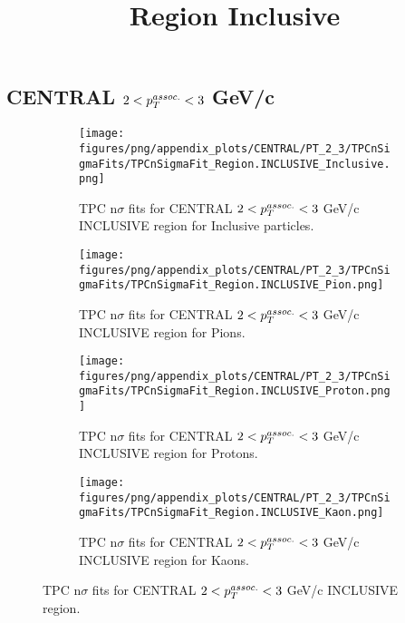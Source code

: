     
            \subsection{CENTRAL $2 < \pTassoc < 3$ GeV/c}
            \begin{figure}[H]
                \title{Region Inclusive}
                \begin{subfigure}[b]{0.5\textwidth}
                    \centering
                    \texttt{[image: figures/png/appendix\_plots/CENTRAL/PT\_2\_3/TPCnSigmaFits/TPCnSigmaFit\_Region.INCLUSIVE\_Inclusive.png]}
                    \caption{TPC n$\sigma$ fits for CENTRAL $2 < \pTassoc < 3$ GeV/c INCLUSIVE region for Inclusive particles.}
                    \label{fig:appendix_CENTRAL_$2 < \pTassoc < 3$ GeV/c_INCLUSIVE_Inclusive}
                \end{subfigure}
                \begin{subfigure}[b]{0.5\textwidth}
                    \centering
                    \texttt{[image: figures/png/appendix\_plots/CENTRAL/PT\_2\_3/TPCnSigmaFits/TPCnSigmaFit\_Region.INCLUSIVE\_Pion.png]}
                    \caption{TPC n$\sigma$ fits for CENTRAL $2 < \pTassoc < 3$ GeV/c INCLUSIVE region for Pions.}
                    \label{fig:appendix_CENTRAL_$2 < \pTassoc < 3$ GeV/c_INCLUSIVE_Pion}
                \end{subfigure}
                \begin{subfigure}[b]{0.5\textwidth}
                    \centering
                    \texttt{[image: figures/png/appendix\_plots/CENTRAL/PT\_2\_3/TPCnSigmaFits/TPCnSigmaFit\_Region.INCLUSIVE\_Proton.png]}
                    \caption{TPC n$\sigma$ fits for CENTRAL $2 < \pTassoc < 3$ GeV/c INCLUSIVE region for Protons.}
                    \label{fig:appendix_CENTRAL_$2 < \pTassoc < 3$ GeV/c_INCLUSIVE_Proton}
                \end{subfigure}
                \begin{subfigure}[b]{0.5\textwidth}
                    \centering
                    \texttt{[image: figures/png/appendix\_plots/CENTRAL/PT\_2\_3/TPCnSigmaFits/TPCnSigmaFit\_Region.INCLUSIVE\_Kaon.png]}
                    \caption{TPC n$\sigma$ fits for CENTRAL $2 < \pTassoc < 3$ GeV/c INCLUSIVE region for Kaons.}
                    \label{fig:appendix_CENTRAL_$2 < \pTassoc < 3$ GeV/c_INCLUSIVE_Kaon}
                \end{subfigure}
                \caption{TPC n$\sigma$ fits for CENTRAL $2 < \pTassoc < 3$ GeV/c INCLUSIVE region.}
                \label{fig:appendix_CENTRAL_$2 < \pTassoc < 3$ GeV/c_INCLUSIVE}
            \end{figure}
